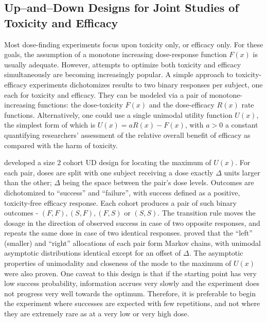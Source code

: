 \subsection{Up--and--Down Designs for Joint Studies of Toxicity and Efficacy }

Most dose-finding experiments focus upon toxicity only, or efficacy only. For these goals, the assumption of a monotone increasing dose-response function $F(x)$ is usually adequate. However, attempts to optimize both toxicity and efficacy simultaneously are becoming increasingly popular. A simple approach to toxicity-efficacy experiments dichotomizes results to two binary responses per subject, one each for toxicity and efficacy. They can be modeled via a pair of monotone-increasing functions: the dose-toxicity $F(x)$ and the dose-efficacy $R(x)$ rate functions. Alternatively, one could use a single unimodal utility function $U(x)$, the simplest form of which is $U(x)=aR(x)-F(x)$, with $a>0$ a constant quantifying researchers' assessment of the relative overall benefit of efficacy as compared with the harm of toxicity.

\cite{Kpam:Flou:opti:2001} developed a size $2$ cohort UD design for locating the maximum of $U(x)$. For each pair, doses are split with one subject receiving a dose  exactly $\Delta$ units larger than the other; $\Delta$ being the space between the pair's dose levels. Outcomes are dichotomized to ``success'' and ``failure'', with success defined as a positive, toxicity-free efficacy response. Each cohort produces a pair of such binary outcomes - $(F,F),(S,F),(F,S)$ or $(S,S)$. The transition rule moves the dosage in the direction of observed success in case of two opposite responses, and repeats the same dose in case of two identical responses. \cite{Kpam:Flou:opti:2008} proved that the ``left'' (smaller) and ``right'' allocations of each pair form Markov chains, with unimodal asymptotic distributions identical except for an offset of $\Delta$. The asymptotic properties of unimodality and closeness of the mode to the maximum of $U(x)$ were also proven. One caveat to this design is that if the starting point has very low success probability, information accrues very slowly and the experiment does not progress very well towards the optimum. Therefore, it is preferable to begin the experiment where successes are expected with few repetitions, and not where they are extremely rare as at a very low or  very high dose.


